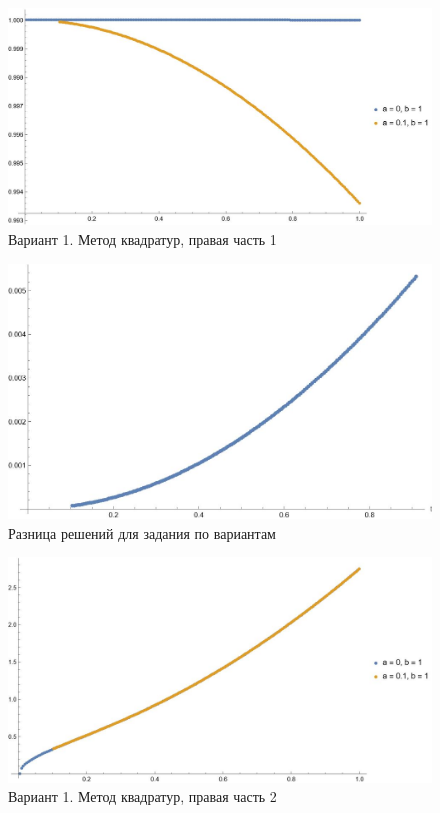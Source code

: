 \documentclass{article}
\begin{document}
	\begin{figure}[H]
        \centering
        \includegraphics[width=\textwidth]{var1.jpg}
        \caption{Вариант 1. Метод квадратур, правая часть 1}
    \end{figure}
	\begin{figure}[H]
        \centering
        \includegraphics[width=\textwidth]{diff_var2.jpg}
        \caption{Разница решений для задания по вариантам}
    \end{figure}
	\begin{figure}[H]
        \centering
        \includegraphics[width=\textwidth]{var2.jpg}
        \caption{Вариант 1. Метод квадратур, правая часть 2}
    \end{figure}
\end{document}
